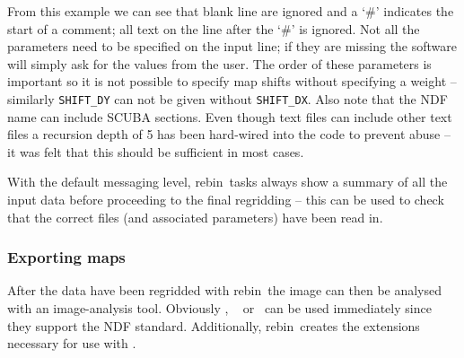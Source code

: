 \documentclass[twoside,11pt]{article}
\newcommand{\Kappa}{\xref{{\sc{Kappa}}}{sun95}{}}
\newcommand{\Figaro}{\xref{{\sc{Figaro}}}{sun86}{}}
\newcommand{\gaia}{\xref{{\sc{Gaia}}}{sun214}{}}
\newcommand{\Iras}{\xref{{\sc{Iras90}}}{sun163}{}}
\newcommand{\task}[1]{{\sf #1}}
\newcommand{\param}[1]{{\tt #1}}
\newcommand{\rebin}{\htmlref{\task{rebin}}{REBIN}}
\newcommand{\htmlref}[2]{#1}
\newcommand{\xref}[3]{#1}
\begin{document}
From this example we can see that blank line are ignored and a `\#' indicates
the start of a comment; all text on the line after the `\#' is ignored. Not
all the parameters need to be specified on the input line; if they are missing
the software will simply ask for the values from the user. The order of these
parameters is important so it is not possible to specify map shifts without
specifying a weight -- similarly \param{SHIFT\_DY} can not be given without
\param{SHIFT\_DX}. Also note that the NDF name can include SCUBA sections.
Even though text files can include other text files a recursion depth of 5 has
been hard-wired into the code to prevent abuse -- it was felt that this should
be sufficient in most cases.

With the default messaging level, \rebin\ tasks always show a summary
of all the input data before proceeding to the final regridding -- this
can be used to check that the correct files (and associated parameters) 
have been read in.

\subsubsection{Exporting maps}

After the data have been regridded with \rebin\ the image can then be
analysed with an image-analysis tool. Obviously \Kappa, \Figaro\ \cite{figaro}
or \gaia\ can be used immediately since they support the NDF standard.
Additionally, \rebin\ creates the extensions necessary for use with
\Iras\cite{iras90}.
\end{document}

